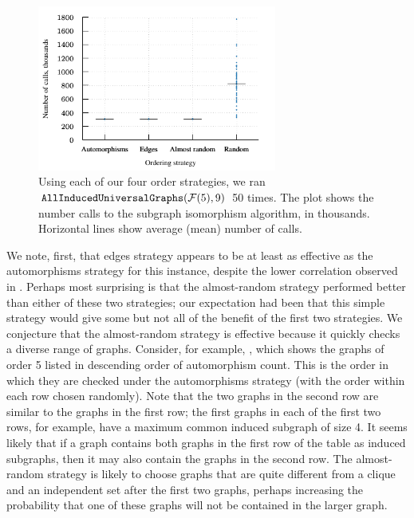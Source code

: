 \documentclass[12pt]{article}
\newcommand{\calF}{\ensuremath{\mathcal{F}}}
\begin{document}
\begin{figure}[h!]
    \centering

    \includegraphics*[width=0.7\textwidth]{img/second-experiment-plot}

    \caption{Using each of our four order strategies, we ran
        $\FuncSty{AllInducedUniversalGraphs}(\calF(5),9)$ 50 times. The plot
        shows the number calls to the subgraph isomorphism algorithm, in thousands.
        Horizontal lines show average (mean) number of calls.}
\label{fig:second-experiment}
\end{figure}

We note, first, that edges strategy appears to be at least as effective
as the automorphisms strategy for this instance, despite the lower
correlation observed in .  Perhaps most surprising is
that the almost-random strategy performed better than either of these two
strategies; our expectation had been that this simple strategy would
give some but not all of the benefit of the first two strategies.
We conjecture that the almost-random strategy is effective because it
quickly checks a diverse range of graphs.  Consider, for example,
, which shows the graphs of order 5 listed
in descending order of automorphism count.  This is the order in which they
are checked under the automorphisms strategy (with the order within each
row chosen randomly).  Note that the two graphs in the second row are
similar to the graphs in the first row; the first graphs in each of the first
two rows, for example, have a maximum common induced subgraph of size 4.
It seems likely that if a graph contains both graphs in the first row of
the table as induced subgraphs, then it may also contain the graphs in the
second row. The almost-random strategy is likely to choose graphs
that are quite different from a clique and an independent set after the first
two graphs, perhaps increasing the probability that one of these graphs
will not be contained in the larger graph.
\end{document}
